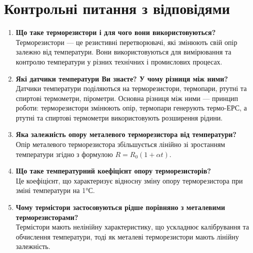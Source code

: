 \documentclass[a4paper]{article}
\begin{document}
\section*{Контрольні питання з відповідями}
\begin{enumerate}
    \item \textbf{Що таке терморезистори і для чого вони використовуються?}\\
    Терморезистори — це резистивні перетворювачі, які змінюють свій опір залежно від температури. Вони використовуються для вимірювання та контролю температури у різних технічних і промислових процесах.
    
    \item \textbf{Які датчики температури Ви знаєте? У чому різниця між ними?}\\
    Датчики температури поділяються на терморезистори, термопари, ртутні та спиртові термометри, пірометри. Основна різниця між ними — принцип роботи: терморезистори змінюють опір, термопари генерують термо-ЕРС, а ртутні та спиртові термометри використовують розширення рідини.
    
    \item \textbf{Яка залежність опору металевого терморезистора від температури?}\\
    Опір металевого терморезистора збільшується лінійно зі зростанням температури згідно з формулою $R = R_0 (1 + \alpha t)$.
    
    \item \textbf{Що таке температурний коефіцієнт опору терморезисторів?}\\
    Це коефіцієнт, що характеризує відносну зміну опору терморезистора при зміні температури на 1°С.
    
    \item \textbf{Чому термістори застосовуються рідше порівняно з металевими терморезисторами?}\\
    Термістори мають нелінійну характеристику, що ускладнює калібрування та обчислення температури, тоді як металеві терморезистори мають лінійну залежність.
    
\end{enumerate}
\end{document}
